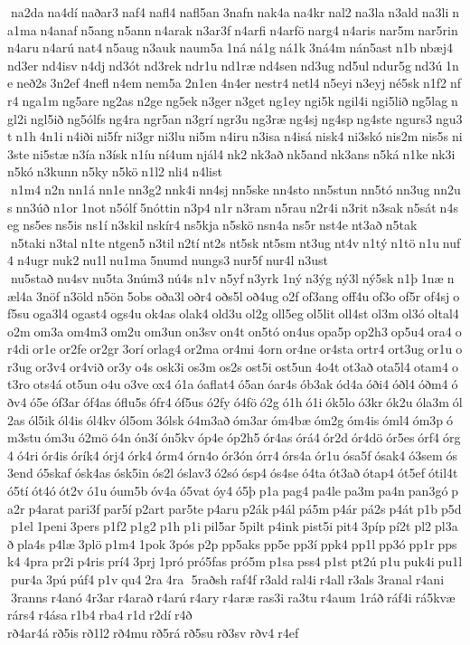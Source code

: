  na2da na4dí naðar3 naf4 nafl4 nafl5an 3nafn nak4a na4kr nal2 na3la n3ald na3li na1ma n4anaf n5ang n5ann n4arak n3ar3f n4arfi n4arfö narg4 n4aris nar5m nar5rin n4aru n4arú nat4 n5aug n3auk naum5a 1ná ná1g ná1k 3ná4m nán5ast n1b nbæj4 nd3er nd4isv n4dj nd3ót nd3rek ndr1u nd1ræ nd4sen nd3ug nd5ul ndur5g nd3ú 1ne neð2s 3n2ef 4nefl n4em nem5a 2n1en 4n4er nestr4 netl4 n5eyi n3eyj né5sk n1f2 nfr4 nga1m ng5are ng2as n2ge ng5ek n3ger n3get ng1ey ngi5k ngil4i ngi5lið ng5lag ngl2i ngl5ið ng5ólfs ng4ra ngr5an n3grí ngr3u ng3ræ ng4sj ng4sp ng4ste ngurs3 ngu3t n1h 4n1i n4iði ni5fr ni3gr ni3lu ni5m n4iru n3isa n4isá nisk4 ni3skó nis2m nis5s ni3ste ni5stæ n3ía n3ísk n1íu ní4um njál4 nk2 nk3að nk5and nk3ans n5ká n1ke nk3i n5kó n3kunn n5ky n5kö n1l2 nli4 n4list  n1m4 n2n nn1á nn1e nn3g2 nnk4i nn4sj nn5ske nn4sto nn5stun nn5tó nn3ug nn2us nn3úð n1or 1not n5ólf 5nóttin n3p4 n1r n3ram n5rau n2r4i n3rit n3sak n5sát n4seg ns5es ns5is ns1í n3skil nskír4 ns5kja n5skö nsn4a ns5r nst4e nt3að n5tak  n5taki n3tal n1te ntgen5 n3til n2tí nt2s nt5sk nt5sm nt3ug nt4v n1tý n1tö n1u nuf4 n4ugr nuk2 nu1l nu1ma 5numd nungs3 nur5f nur4l n3ust  nu5stað nu4sv nu5ta 3núm3 nú4s n1v n5yf n3yrk 1ný n3ýg ný3l ný5sk n1þ 1næ næl4a 3nöf n3öld n5ön 5obs oða3l oðr4 oðs5l oð4ug o2f of3ang off4u of3o of5r of4sj of5su oga3l4 ogast4 ogs4u ok4as olak4 old3u ol2g oll5eg ol5lit oll4st ol3m ol3ó oltal4 o2m om3a om4m3 om2u om3un on3sv on4t on5tó on4us opa5p op2h3 op5u4 ora4 or4di or1e or2fe or2gr 3orí orlag4 or2ma or4mi 4orn or4ne or4sta ortr4 ort3ug or1u or3ug or3v4 or4við or3y o4s osk3i os3m os2s ost5i ost5un 4o4t ot3að ota5l4 otam4 ot3ro ots4á ot5un o4u o3ve ox4 ó1a óaflat4 ó5an óar4s ób3ak ód4a óði4 óðl4 óðm4 óðv4 ó5e óf3ar óf4as óflu5s ófr4 óf5us ó2fy ó4fö ó2g ó1h ó1i ók5lo ó3kr ók2u óla3m ól2as ól5ik ól4is ól4kv ól5om 3ólsk ó4m3að óm3ar óm4bæ óm2g óm4is óml4 óm3p óm3stu óm3u ó2mö ó4n ón3í ón5kv óp4e óp2h5 ór4as órá4 ór2d ór4dö ór5es órf4 órg4 ó4ri ór4is órík4 órj4 órk4 órm4 órn4o ór3ón órr4 órs4a ór1u ósa5f ósak4 ó3sem ós3end ó5skaf ósk4as ósk5in ós2l óslav3 ó2só ósp4 ós4se ó4ta ót3að ótap4 ót5ef ótil4t ó5tí ót4ó ót2v ó1u óum5b óv4a ó5vat óy4 ó5þ p1a pag4 pa4le pa3m pa4n pan3gó pa2r p4arat pari3f par5í p2art par5te p4aru p2ák p4ál pá5m p4ár pá2s p4át p1b p5d p1el 1peni 3pers p1f2 p1g2 p1h p1i pil5ar 5pilt p4ink pist5i pit4 3píp pí2t pl2 pl3að pla4s p4læ 3plö p1m4 1pok 3pós p2p pp5aks pp5e pp3í ppk4 pp1l pp3ó pp1r ppsk4 4pra pr2i p4ris prí4 3prj 1pró pró5fas pró5m p1sa pss4 p1st pt2ú p1u puk4i pu1l pur4a 3pú púf4 p1v qu4 2ra 4ra  5raðsh raf4f r3ald ral4i r4all r3als 3ranal r4ani  3ranns r4anó 4r3ar r4arað r4arú r4ary r4aræ ras3i ra3tu r4aum 1ráð ráf4i rá5kvæ rárs4 r4ása r1b4 rba4 r1d r2dí r4ð 	rð4ar4á rð5is rð1l2 rð4mu rð5rá rð5su rð3sv rðv4 r4ef 